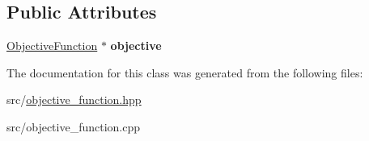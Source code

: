 \subsection*{Public Attributes}
\begin{DoxyCompactItemize}
\item 
\hypertarget{classObjectiveValue_a12509b8168294b3b1a76ec092dd48a3a}{\hyperlink{classObjectiveFunction}{Objective\-Function} $\ast$ {\bfseries objective}}\label{classObjectiveValue_a12509b8168294b3b1a76ec092dd48a3a}

\end{DoxyCompactItemize}


The documentation for this class was generated from the following files\-:\begin{DoxyCompactItemize}
\item 
src/\hyperlink{objective__function_8hpp}{objective\-\_\-function.\-hpp}\item 
src/objective\-\_\-function.\-cpp\end{DoxyCompactItemize}
